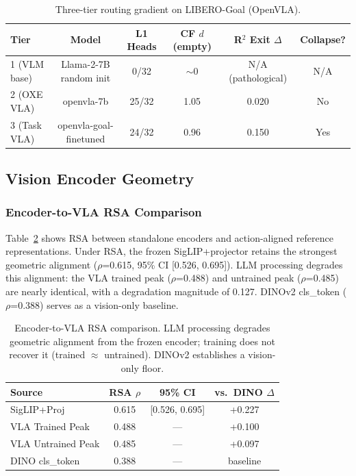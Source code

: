 \documentclass[letterpaper]{article}
\begin{document}
\begin{table}[t]
\centering
\caption{Three-tier routing gradient on LIBERO-Goal (OpenVLA).}
\label{tab:three-tier-goal}
\small
\begin{tabular}{lccccc}
\toprule
Tier & Model & L1 Heads & CF $d$ (empty) & R$^2$ Exit $\Delta$ & Collapse? \\
\midrule
1 (VLM base) & Llama-2-7B random init & 0/32   & $\sim$0  & N/A (pathological) & N/A \\
2 (OXE VLA)  & openvla-7b             & 25/32  & 1.05     & 0.020             & No \\
3 (Task VLA) & openvla-goal-finetuned & 24/32  & 0.96     & 0.150             & Yes \\
\bottomrule
\end{tabular}
\end{table}

\subsection{Vision Encoder Geometry}
\label{sec:encoder-geometry}

\subsubsection{Encoder-to-VLA RSA Comparison}
\label{sec:rsa-encoder}

Table~\ref{tab:rsa-encoder} shows RSA between standalone encoders and action-aligned reference representations.
Under RSA, the frozen SigLIP+projector retains the strongest geometric alignment ($\rho$=0.615, 95\% CI [0.526, 0.695]).
LLM processing degrades this alignment: the VLA trained peak ($\rho$=0.488) and untrained peak ($\rho$=0.485) are nearly identical, with a degradation magnitude of 0.127.
DINOv2 cls\_token ($\rho$=0.388) serves as a vision-only baseline.

\begin{table}[t]
\centering
\caption{Encoder-to-VLA RSA comparison. LLM processing degrades geometric alignment from the frozen encoder; training does not recover it (trained $\approx$ untrained). DINOv2 establishes a vision-only floor.}
\label{tab:rsa-encoder}
\small
\begin{tabular}{lccc}
\toprule
Source & RSA $\rho$ & 95\% CI & vs.\ DINO $\Delta$ \\
\midrule
SigLIP+Proj       & 0.615 & [0.526, 0.695] & +0.227 \\
VLA Trained Peak   & 0.488 & ---            & +0.100 \\
VLA Untrained Peak & 0.485 & ---            & +0.097 \\
DINO cls\_token    & 0.388 & ---            & baseline \\
\bottomrule
\end{tabular}
\end{table}
\end{document}

